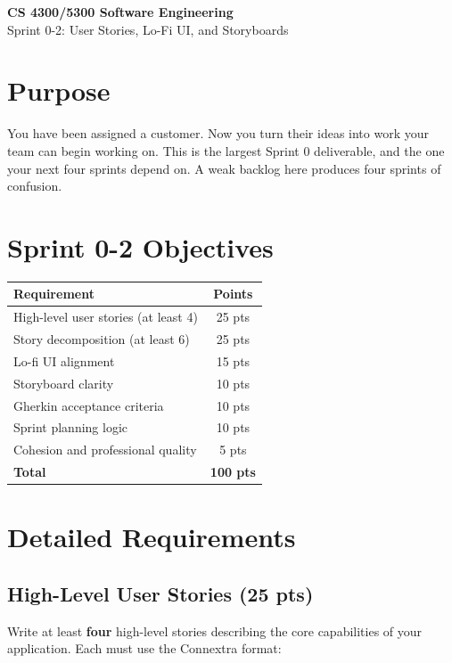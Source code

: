 \documentclass[11pt]{article}
\begin{document}
\begin{center}
{\LARGE\textbf{CS 4300/5300 Software Engineering}}\\[0.5em]
{\Large Sprint 0-2: User Stories, Lo-Fi UI, and Storyboards}\\[1em]
\end{center}

\section{Purpose}

You have been assigned a customer. Now you turn their ideas into work your team can begin working on. This is the largest Sprint 0 deliverable, and the one your next four sprints depend on. A weak backlog here produces four sprints of confusion.

\section{Sprint 0-2 Objectives}

\begin{center}
\begin{tabular}{lc}
\toprule
\textbf{Requirement} & \textbf{Points} \\
\midrule
High-level user stories (at least 4) & 25 pts \\
Story decomposition (at least 6) & 25 pts \\
Lo-fi UI alignment & 15 pts \\
Storyboard clarity & 10 pts \\
Gherkin acceptance criteria & 10 pts \\
Sprint planning logic & 10 pts \\
Cohesion and professional quality & 5 pts \\
\midrule
\textbf{Total} & \textbf{100 pts} \\
\bottomrule
\end{tabular}
\end{center}

\section{Detailed Requirements}

\subsection{High-Level User Stories (25 pts)}
Write at least \textbf{four} high-level stories describing the core capabilities of your application. Each must use the Connextra format:
\end{document}
